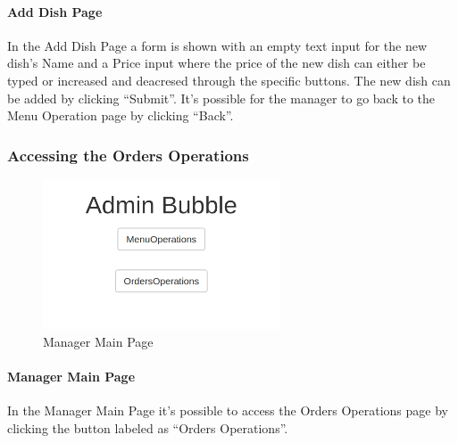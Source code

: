 \paragraph{Add Dish Page}
In the Add Dish Page a form is shown with an empty text input for the new dish's Name and a Price input where the price of the new dish can either be typed or increased and deacresed through the specific buttons. The new dish can be added by clicking ``Submit''.
It's possible for the manager to go back to the Menu Operation page by clicking ``Back''.

\subsubsection{Accessing the Orders Operations}
\begin{figure}[H]
	\centering
	\includegraphics[width=7cm]{../../documenti/UserManualDemo/demo_screens/admin_main.png}
	\caption{Manager Main Page}
\end{figure}
\paragraph{Manager Main Page}
In the Manager Main Page it's possible to access the Orders Operations page by clicking the button labeled as ``Orders Operations''.